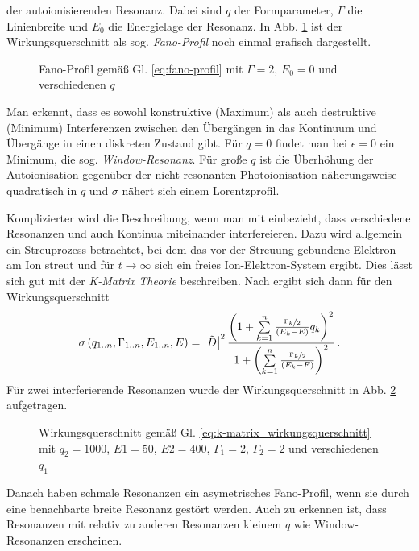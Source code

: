der autoionisierenden Resonanz. Dabei sind $q$ der Formparameter, $\Gamma$ die
Linienbreite und $E_0$ die Energielage der Resonanz. In Abb. \ref{fig:fano} ist
der Wirkungsquerschnitt als sog. \textit{Fano-Profil} noch einmal grafisch
dargestellt.
\begin{figure}
	\centering
	\footnotesize
	
	\caption[Fano-Profil]{Fano-Profil gemäß Gl. \eqref{eq:fano-profil} mit
	$\Gamma=2$, $E_0=0$ und verschiedenen $q$}\label{fig:fano}
\end{figure}
Man erkennt, dass es sowohl konstruktive (Maximum) als auch destruktive
(Minimum) Interferenzen zwischen den Übergängen in das Kontinuum und Übergänge
in einen diskreten Zustand gibt. Für $q=0$ findet man bei $\epsilon=0$ ein
Minimum, die sog. \textit{Window-Resonanz}. Für große $q$ ist die Überhöhung der
Autoionisation gegenüber der nicht-resonanten Photoionisation näherungsweise
quadratisch in $q$ und $\sigma$ nähert sich einem Lorentzprofil.\par
Komplizierter wird die Beschreibung, wenn man mit einbezieht, dass verschiedene
Resonanzen und auch Kontinua miteinander interfereieren. Dazu wird allgemein ein
Streuprozess betrachtet, bei dem das vor der Streuung gebundene Elektron am
Ion streut und für $t\to\infty$ sich ein freies Ion-Elektron-System ergibt. Dies
lässt sich gut mit der \textit{K-Matrix Theorie} beschreiben. Nach
\cite{connerade:1998:highly_excited_atoms} ergibt sich dann für den
Wirkungsquerschnitt
\begin{equation}\label{eq:k-matrix_wirkungsquerschnitt}
	\sigma\left(q_{1..n},\Gamma_{1..n},E_{1..n},E\right)=\left|\tilde{D}\right|^2\frac{\left(1+\sum\limits_{k=1}^n{\frac{\nicefrac{\Gamma_k}{2}}{\left(E_k-E\right)}q_k}\right)^2}{1+\left(\sum\limits_{k=1}^n{\frac{\nicefrac{\Gamma_k}{2}}{\left(E_k-E\right)}}\right)^2}\,.
\end{equation}
Für zwei interferierende Resonanzen wurde der Wirkungsquerschnitt in Abb.
\ref{fig:k-matrix_wirkungsquerschnitt} aufgetragen.
\begin{figure}
	\centering
	\footnotesize
	
	\caption[Wirkungsquerschnitt - K-Matrix Theorie]{Wirkungsquerschnitt gemäß Gl.
	\eqref{eq:k-matrix_wirkungsquerschnitt} mit $q_2=1000$, $E1=50$, $E2=400$, $\Gamma_1=2$, $\Gamma_2=2$ und
	verschiedenen $q_1$}\label{fig:k-matrix_wirkungsquerschnitt}
\end{figure}
Danach haben schmale Resonanzen ein asymetrisches Fano-Profil, wenn sie durch
eine benachbarte breite Resonanz gestört werden. Auch zu erkennen ist, dass
Resonanzen mit relativ zu anderen Resonanzen kleinem $q$ wie Window-Resonanzen
erscheinen.

